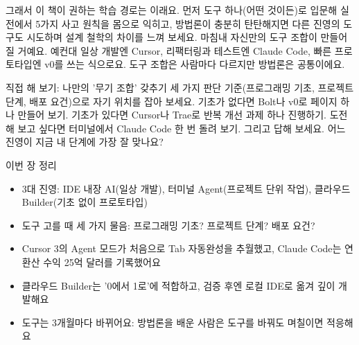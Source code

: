 그래서 이 책이 권하는 학습 경로는 이래요. 먼저 도구 하나(어떤 것이든)로 입문해 실전에서 5가지 사고 원칙을 몸으로 익히고, 방법론이 충분히 탄탄해지면 다른 진영의 도구도 시도하며 설계 철학의 차이를 느껴 보세요. 마침내 자신만의 도구 조합이 만들어질 거예요. 예컨대 일상 개발엔 Cursor, 리팩터링과 테스트엔 Claude Code, 빠른 프로토타입엔 v0를 쓰는 식으로요. 도구 조합은 사람마다 다르지만 방법론은 공통이에요.

\begin{tcbpractice}{직접 해 보기: 나만의 '무기 조합' 갖추기}
세 가지 판단 기준(프로그래밍 기초, 프로젝트 단계, 배포 요건)으로 자기 위치를 잡아 보세요. 기초가 없다면 Bolt나 v0로 페이지 하나 만들어 보기. 기초가 있다면 Cursor나 Trae로 반복 개선 과제 하나 진행하기. 도전해 보고 싶다면 터미널에서 Claude Code 한 번 돌려 보기. 그리고 답해 보세요. 어느 진영이 지금 내 단계에 가장 잘 맞나요?

\end{tcbpractice}

\begin{tcbsummary}{이번 장 정리}
\begin{itemize}
  \item 3대 진영: IDE 내장 AI(일상 개발), 터미널 Agent(프로젝트 단위 작업), 클라우드 Builder(기초 없이 프로토타입)
  \item 도구 고를 때 세 가지 물음: 프로그래밍 기초? 프로젝트 단계? 배포 요건?
  \item Cursor 3의 Agent 모드가 처음으로 Tab 자동완성을 추월했고, Claude Code는 연환산 수익 25억 달러를 기록했어요
  \item 클라우드 Builder는 '0에서 1로'에 적합하고, 검증 후엔 로컬 IDE로 옮겨 깊이 개발해요
  \item 도구는 3개월마다 바뀌어요: 방법론을 배운 사람은 도구를 바꿔도 며칠이면 적응해요
\end{itemize}

\end{tcbsummary}
